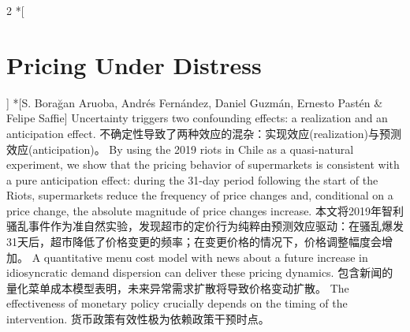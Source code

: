 \documentclass[cn,hazy,blue,14pt,screen]{elegantnote}
\begin{document}
\begin{paracol}{2}
	\switchcolumn[0]*[\section{Pricing Under Distress}]
	\switchcolumn[0]*[S. Borağan Aruoba, Andrés Fernández, Daniel Guzmán, Ernesto Pastén \& Felipe Saffie]
	\switchcolumn
	\switchcolumn
	Uncertainty triggers two confounding effects: a realization and an anticipation effect.
	\switchcolumn
	不确定性导致了两种效应的混杂：实现效应(realization)与预测效应(anticipation)。
	\switchcolumn*
	By using the 2019 riots in Chile as a quasi-natural experiment, we show that the pricing behavior of supermarkets is consistent with a pure anticipation effect: during the 31-day period following the start of the Riots, supermarkets reduce the frequency of price changes and, conditional on a price change, the absolute magnitude of price changes increase. 
	\switchcolumn
	本文将2019年智利骚乱事件作为准自然实验，发现超市的定价行为纯粹由预测效应驱动：在骚乱爆发31天后，超市降低了价格变更的频率；在变更价格的情况下，价格调整幅度会增加。
	\switchcolumn*
	A quantitative menu cost model with news about a future increase in idiosyncratic demand dispersion can deliver these pricing dynamics. 
	\switchcolumn
	包含新闻的量化菜单成本模型表明，未来异常需求扩散将导致价格变动扩散。
	\switchcolumn*
	The effectiveness of monetary policy crucially depends on the timing of the intervention.
	\switchcolumn
	货币政策有效性极为依赖政策干预时点。
\end{paracol}
\end{document}
